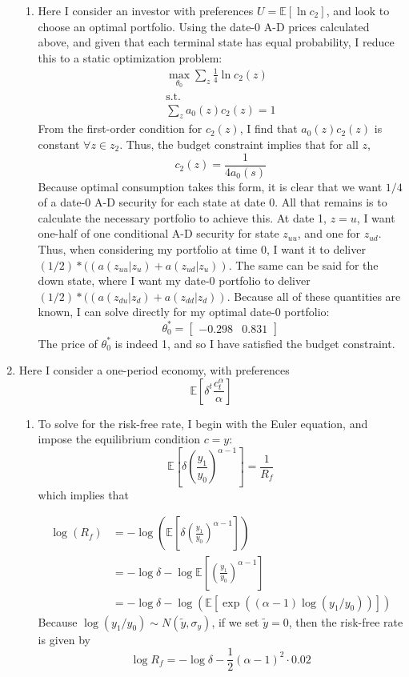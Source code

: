 \documentclass[11pt]{article}
\newcommand{\ev}{\mathbb{E}}
\begin{document}
\begin{enumerate}
\begin{enumerate}
		\item Here I consider an investor with preferences \(U = \ev[\ln c_2]\), and look to choose an optimal portfolio. Using the date-0 A-D prices calculated above, and given that each terminal state has equal probability, I reduce this to a static optimization problem:
		\begin{gather*}
			\max_{\theta_0} \sum_z \frac{1}{4} \ln c_2(z) \\
			\text{s.t.} \\
			\sum_z a_0(z)c_2(z) = 1
		\end{gather*}
		From the first-order condition for \(c_2(z)\), I find that \(a_0(z)c_2(z)\) is constant \(\forall z\in z_2\). Thus, the budget constraint implies that for all \(z\), 
		\[c_2(z) = \frac{1}{4 a_0(s)}\]
		Because optimal consumption takes this form, it is clear that we want \(1/4\) of a date-0 A-D security for each state at date 0. All that remains is to calculate the necessary portfolio to achieve this. At date 1, \(z = u\), I want one-half of one conditional A-D security for state \(z_{uu}\), and one for \(z_{ud}\). Thus, when considering my portfolio at time 0, I want it to deliver \( (1/2) * ((a(z_{uu} | z_u) + a(z_{ud} | z_u))\). The same can be said for the down state, where I want my date-0 portfolio to deliver \((1/2) * ((a(z_{du} | z_d) + a(z_{dd} | z_d))\). Because all of these quantities are known, I can solve directly for my optimal date-0 portfolio:
		\[\theta^*_0 = \begin{bmatrix}
			-0.298 & 0.831
		\end{bmatrix}\]
		The price of \(\theta^*_0\) is indeed 1, and so I have satisfied the budget constraint. 
	\end{enumerate} 

	\item Here I consider a one-period economy, with preferences 
	\[\ev\left[\delta^t \frac{c_t^\alpha}{\alpha}\right]\]
	\begin{enumerate}
		\item To solve for the risk-free rate, I begin with the Euler equation, and impose the equilibrium condition \(c = y\):
		\[\ev\left[\delta \left(\frac{y_1}{y_0}\right)^{\alpha - 1} \right] = \frac{1}{R_f}\]
		which implies that 
		
		\begin{align*}
			\log(R_f) &= -\log\left(\ev\left[\delta \left(\frac{y_1}{y_0}\right)^{\alpha - 1} \right]\right) \\
			&= -\log \delta - \log \ev\left[ \left(\frac{y_1}{y_0}\right)^{\alpha - 1} \right] \\
			&= -\log \delta - \log\left( \ev\left[ \exp((\alpha - 1)\log(y_1 / y_0)) \right] \right)
		\end{align*}
		Because \(\log(y_1 / y_0)\sim N(\tilde{y}, \sigma_y)\), if we set \(\tilde{y} = 0\), then the risk-free rate is given by 
		\[\log R_f = -\log\delta - \frac{1}{2}(\alpha - 1)^2 \cdot 0.02\]


\end{enumerate}
\end{enumerate}
\end{document}
